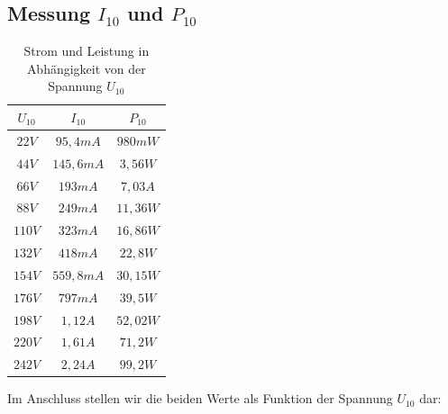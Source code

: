 \documentclass{article}
\begin{document}
\subsection{Messung $I_{10}$ und $P_{10}$}
\label{sec:messung-i_10}
\begin{table}[h]
  \centering
  \begin{tabular}{|c|c|c|}
    \hline
    $U_{10}$ & $I_{10}$ & $P_{10}$ \\
    \hline
    $22V$ & $95,4mA$ & $980mW$ \\
    \hline
    $44V$ & $145,6mA$ & $3,56W$ \\
    \hline
    $66V$ & $193mA$ & $7,03A$ \\
    \hline
    $88V$ & $249mA$ & $11,36W$ \\
    \hline
    $110V$ & $323mA$ & $16,86W$ \\
    \hline
    $132V$ & $418mA$ & $22,8W$ \\
    \hline
    $154V$ & $559,8mA$ & $30,15W$\\
    \hline
    $176V$ & $797mA$ & $39,5W$\\
    \hline
    $198V$ & $1,12A$ & $52,02W$\\
    \hline
    $220V$ & $1,61A$ & $71,2W$\\
    \hline
    $242V$ & $2,24A$ & $99,2W$\\
    \hline
  \end{tabular}
  \caption{Strom und Leistung in Abhängigkeit von der Spannung $U_{10}$}
  \label{tab:fifp}
\end{table}

Im Anschluss stellen wir die beiden Werte als Funktion der Spannung $U_{10}$ dar:
\end{document}
